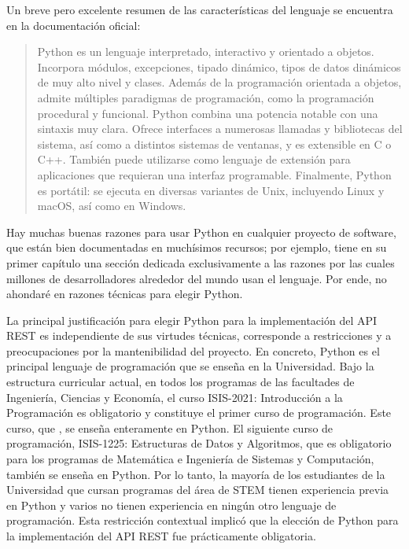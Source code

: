 Un breve pero excelente resumen de las características del lenguaje se encuentra en la documentación oficial:
\begin{quote}
	\gls{Python} es un lenguaje interpretado, interactivo y orientado a objetos. Incorpora módulos, excepciones, tipado dinámico, tipos de datos dinámicos de muy alto nivel y clases. Además de la programación orientada a objetos, admite múltiples paradigmas de programación, como la programación procedural y funcional. \gls{Python} combina una potencia notable con una sintaxis muy clara. Ofrece interfaces a numerosas llamadas y bibliotecas del sistema, así como a distintos sistemas de ventanas, y es extensible en C o C++. También puede utilizarse como lenguaje de extensión para aplicaciones que requieran una interfaz programable. Finalmente, \gls{Python} es portátil: se ejecuta en diversas variantes de Unix, incluyendo Linux y macOS, así como en Windows. \cite{python_official_docs}
\end{quote} %
\noindent Hay muchas buenas razones para usar \gls{Python} en cualquier proyecto de software, que están bien documentadas en muchísimos recursos; por ejemplo, \cite{learning_python} tiene en su primer capítulo una sección dedicada exclusivamente a las razones por las cuales millones de desarrolladores alrededor del mundo usan el lenguaje. Por ende, no ahondaré en razones técnicas para elegir \gls{Python}.

La principal justificación para elegir \gls{Python} para la implementación del \gls{API REST} es independiente de sus virtudes técnicas, corresponde a restricciones y a preocupaciones por la mantenibilidad del proyecto. En concreto, \gls{Python} es el principal lenguaje de programación que se enseña en la Universidad. Bajo la estructura curricular actual, en todos los programas de las facultades de Ingeniería, Ciencias y Economía, el curso ISIS-2021: Introducción a la Programación es obligatorio y constituye el primer curso de programación. %
Este curso, que  \cite{ip}, se enseña enteramente en \gls{Python}. El siguiente curso de programación, ISIS-1225: Estructuras de Datos y Algoritmos, que es obligatorio para los programas de Matemática e Ingeniería de Sistemas y Computación, también se enseña en \gls{Python}. %
Por lo tanto, la mayoría de los estudiantes de la Universidad que cursan programas del área de STEM tienen experiencia previa en \gls{Python} y varios no tienen experiencia en ningún otro lenguaje de programación. Esta restricción contextual implicó que la elección de \gls{Python} para la implementación del \gls{API REST} fue prácticamente obligatoria.

